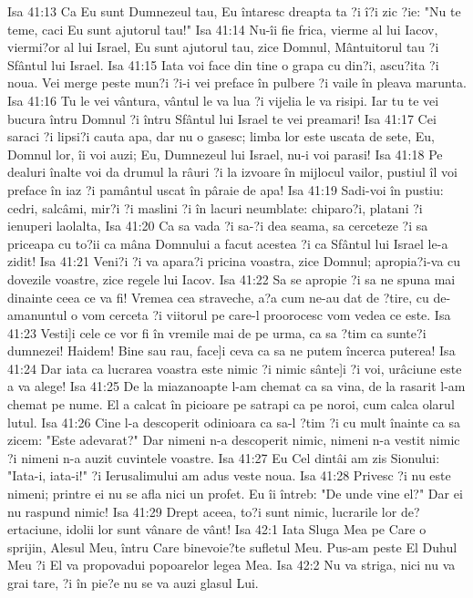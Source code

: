Isa 41:13  Ca Eu sunt Dumnezeul tau, Eu întaresc dreapta ta ?i î?i zic ?ie: "Nu te teme, caci Eu sunt ajutorul tau!"
Isa 41:14  Nu-îi fie frica, vierme al lui Iacov, viermi?or al lui Israel, Eu sunt ajutorul tau, zice Domnul, Mântuitorul tau ?i Sfântul lui Israel.
Isa 41:15  Iata voi face din tine o grapa cu din?i, ascu?ita ?i noua. Vei merge peste mun?i ?i-i vei preface în pulbere ?i vaile în pleava marunta.
Isa 41:16  Tu le vei vântura, vântul le va lua ?i vijelia le va risipi. Iar tu te vei bucura întru Domnul ?i întru Sfântul lui Israel te vei preamari!
Isa 41:17  Cei saraci ?i lipsi?i cauta apa, dar nu o gasesc; limba lor este uscata de sete, Eu, Domnul lor, îi voi auzi; Eu, Dumnezeul lui Israel, nu-i voi parasi!
Isa 41:18  Pe dealuri înalte voi da drumul la râuri ?i la izvoare în mijlocul vailor, pustiul îl voi preface în iaz ?i pamântul uscat în pâraie de apa!
Isa 41:19  Sadi-voi în pustiu: cedri, salcâmi, mir?i ?i maslini ?i în lacuri neumblate: chiparo?i, platani ?i ienuperi laolalta,
Isa 41:20  Ca sa vada ?i sa-?i dea seama, sa cerceteze ?i sa priceapa cu to?ii ca mâna Domnului a facut acestea ?i ca Sfântul lui Israel le-a zidit!
Isa 41:21  Veni?i ?i va apara?i pricina voastra, zice Domnul; apropia?i-va cu dovezile voastre, zice regele lui Iacov.
Isa 41:22  Sa se apropie ?i sa ne spuna mai dinainte ceea ce va fi! Vremea cea straveche, a?a cum ne-au dat de ?tire, cu de-amanuntul o vom cerceta ?i viitorul pe care-l proorocesc vom vedea ce este.
Isa 41:23  Vesti]i cele ce vor fi în vremile mai de pe urma, ca sa ?tim ca sunte?i dumnezei! Haidem! Bine sau rau, face]i ceva ca sa ne putem încerca puterea!
Isa 41:24  Dar iata ca lucrarea voastra este nimic ?i nimic sânte]i ?i voi, urâciune este a va alege!
Isa 41:25  De la miazanoapte l-am chemat ca sa vina, de la rasarit l-am chemat pe nume. El a calcat în picioare pe satrapi ca pe noroi, cum calca olarul lutul.
Isa 41:26  Cine l-a descoperit odinioara ca sa-l ?tim ?i cu mult înainte ca sa zicem: "Este adevarat?" Dar nimeni n-a descoperit nimic, nimeni n-a vestit nimic ?i nimeni n-a auzit cuvintele voastre.
Isa 41:27  Eu Cel dintâi am zis Sionului: "Iata-i, iata-i!" ?i Ierusalimului am adus veste noua.
Isa 41:28  Privesc ?i nu este nimeni; printre ei nu se afla nici un profet. Eu îi întreb: "De unde vine el?" Dar ei nu raspund nimic!
Isa 41:29  Drept aceea, to?i sunt nimic, lucrarile lor de?ertaciune, idolii lor sunt vânare de vânt!
Isa 42:1  Iata Sluga Mea pe Care o sprijin, Alesul Meu, întru Care binevoie?te sufletul Meu. Pus-am peste El Duhul Meu ?i El va propovadui popoarelor legea Mea.
Isa 42:2  Nu va striga, nici nu va grai tare, ?i în pie?e nu se va auzi glasul Lui.
